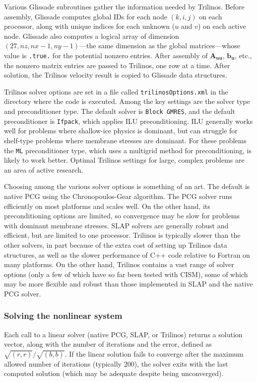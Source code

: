 {Various Glissade subroutines gather the information needed by Trilinos.  Before assembly, Glissade computes
global IDs for each node $(k,i,j)$ on each processor, along with unique indices for each unknown ($u$ and $v$)
on each active node.  Glissade also computes a logical array of dimension $(27,nz,nx-1,ny-1)$---the same dimension
as the global matrices---whose value is \texttt{.true.} for the potential nonzero entries.
After assembly of $\mathbf{A_{uu}}$, $\mathbf{b_u}$, etc., the nonzero matrix entries are passed to Trilinos, one row at a time.
After solution, the Trilinos velocity result is copied to Glissade data structures.

Trilinos solver options are set in a file called \texttt{trilinosOptions.xml} in the directory where the code
is executed.
Among the key settings are the solver type and preconditioner type.  The default solver is \texttt{Block GMRES},
and the default preconditioner is \texttt{Ifpack}, which applies ILU preconditioning.  ILU generally works well
for problems where shallow-ice physics is dominant, but can struggle for shelf-type problems where
membrane stresses are dominant.  For these problems the \texttt{ML} preconditioner type, which uses a multigrid
method for preconditioning, is likely to work better.  Optimal Trilinos settings for large, complex
problems are an area of active research.

Choosing among the various solver options is something of an art.  The default is native PCG using
the Chronopoulos-Gear algorithm.  The PCG solver runs efficiently on most platforms and scales well.
On the other hand, its preconditioning options are limited, so convergence may be slow for problems
with dominant membrane stresses.  SLAP solvers are generally robust and efficient, but are limited
to one processor.  Trilinos is typically slower than the other solvers, in part because of the
extra cost of setting up Trilinos data structures, as well as the slower performance of C++ code
relative to Fortran on many platforms.  On the other hand, Trilinos contains a vast range of
solver options (only a few of which have so far been tested with CISM), some of which may 
be more flexible and robust than those implemented in SLAP and the native PCG solver.

\subsubsection{Solving the nonlinear system}

Each call to a linear solver (native PCG, SLAP, or Trilinos) returns a solution vector,
along with the number of iterations and the error, defined as $\sqrt{(r,r)}/\sqrt{(b,b)}$.
If the linear solution fails to converge after the maximum allowed number of iterations
(typically 200), the solver exits with the last computed solution (which may be adequate
despite being unconverged).

}
